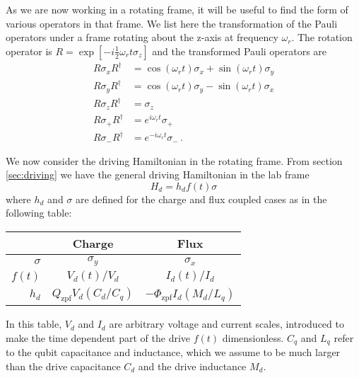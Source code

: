 
As we are now working in a rotating frame, it will be useful to find the form of various operators in that frame.
We list here the transformation of the Pauli operators under a frame rotating about the z-axis at frequency $\omega_r$.
The rotation operator is $R=\exp \left[-i \frac{1}{2} \omega_r t \sigma_z \right]$  and the transformed Pauli operators are
\begin{align*}
  R\sigma_xR^{\dagger} & = \cos(\omega_r t)\sigma_x + \sin(\omega_r t) \sigma_y \\
  R\sigma_yR^{\dagger} & = \cos(\omega_r t)\sigma_y - \sin(\omega_r t) \sigma_x \\
  R\sigma_zR^{\dagger} & = \sigma_z \\
  R\sigma_+R^{\dagger} & = e^{i\omega_r t}\sigma_+ \\
  R\sigma_-R^{\dagger} & = e^{-i\omega_r t}\sigma_- \, .
\end{align*}


We now consider the driving Hamiltonian in the rotating frame.
From section \ref{sec:driving} we have the general driving Hamiltonian in the lab frame
\begin{equation}
  H_d = h_d f(t) \sigma
\end{equation}
where $h_d$ and $\sigma$ are defined for the charge and flux coupled cases as in the following table:
\begin{center}
  \begin{tabular}{r|cc}
    \hline
    & \textbf{Charge} & \textbf{Flux} \\
    \hline
    $\sigma$ & $\sigma_y$ & $\sigma_x$ \\
    $f(t)$ & $V_d(t)/V_d$ & $I_d(t) / I_d$ \\
    $h_d$ & $Q_\text{zpf} V_d(C_d/C_q)$ & $-\Phi_\text{zpf} I_d (M_d/L_q)$ \\
    \hline
  \end{tabular}
\end{center}
In this table, $V_d$ and $I_d$ are arbitrary voltage and current scales, introduced to make the time dependent part of the drive $f(t)$ dimensionless.
$C_q$ and $L_q$ refer to the qubit capacitance and inductance, which we assume to be much larger than the drive capacitance $C_d$ and the drive inductance $M_d$.

